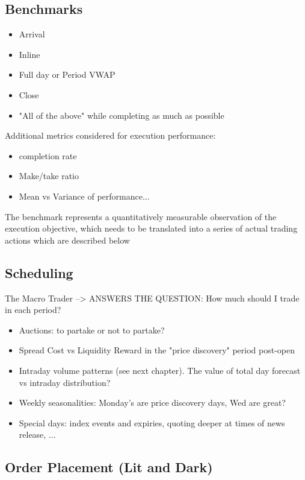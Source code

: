\subsection{Benchmarks}

\begin{itemize}
\item Arrival
\item Inline
\item Full day or Period VWAP
\item Close
\item "All of the above" while completing as much as possible
\end{itemize}

Additional metrics considered for execution performance:
\begin{itemize}
\item completion rate
\item Make/take ratio
\item Mean vs Variance of performance...
\end{itemize}

The benchmark represents a quantitatively measurable observation of the execution objective, which needs to be translated into a series of actual trading actions which are described below


\subsection{Scheduling}

The Macro Trader --> ANSWERS THE QUESTION: How much should I trade in each period?

\begin{itemize}
\item Auctions: to partake or not to partake?
\item Spread Cost vs Liquidity Reward in the "price discovery" period post-open
\item Intraday volume patterns (see next chapter). The value of total day forecast vs intraday distribution?
\item Weekly seasonalities: Monday's are price discovery days, Wed are great?
\item Special days: index events and expiries, quoting deeper at times of news release, ...
\end{itemize}


\subsection{Order Placement (Lit and Dark)}

